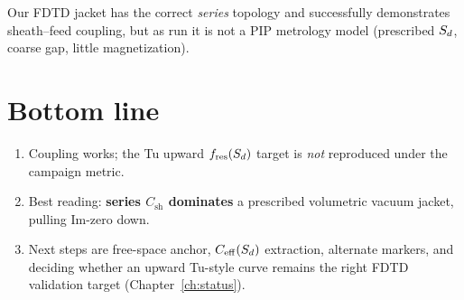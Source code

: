 Our FDTD jacket has the correct \emph{series} topology and successfully demonstrates sheath--feed coupling, but as run it is not a PIP metrology model (prescribed \(S_d\), coarse gap, little magnetization).

\section{Bottom line}

\begin{enumerate}[leftmargin=1.5em]
\item Coupling works; the Tu upward \(f_{\mathrm{res}}(S_d)\) target is \emph{not} reproduced under the campaign metric.
\item Best reading: \textbf{series \(C_{\mathrm{sh}}\) dominates} a prescribed volumetric vacuum jacket, pulling Im-zero down.
\item Next steps are free-space anchor, \(C_{\mathrm{eff}}(S_d)\) extraction, alternate markers, and deciding whether an upward Tu-style curve remains the right FDTD validation target (Chapter~\ref{ch:status}).
\end{enumerate}
